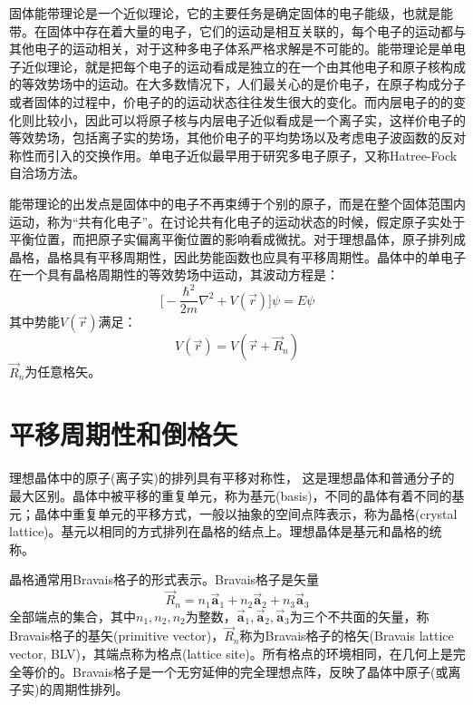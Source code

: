 固体能带理论是一个近似理论，它的主要任务是确定固体的电子能级，也就是能带。在固体中存在着大量的电子，它们的运动是相互关联的，每个电子的运动都与其他电子的运动相关，对于这种多电子体系严格求解是不可能的。能带理论是单电子近似理论，就是把每个电子的运动看成是独立的在一个由其他电子和原子核构成的等效势场中的运动。在大多数情况下，人们最关心的是价电子，在原子构成分子或者固体的过程中，价电子的的运动状态往往发生很大的变化。而内层电子的的变化则比较小，因此可以将原子核与内层电子近似看成是一个离子实，这样价电子的等效势场，包括离子实的势场，其他价电子的平均势场以及考虑电子波函数的反对称性而引入的交换作用。单电子近似最早用于研究多电子原子，又称Hatree-Fock自洽场方法。

能带理论的出发点是固体中的电子不再束缚于个别的原子，而是在整个固体范围内运动，称为“共有化电子”。在讨论共有化电子的运动状态的时候，假定原子实处于平衡位置，而把原子实偏离平衡位置的影响看成微扰。对于理想晶体，原子排列成晶格，晶格具有平移周期性，因此势能函数也应具有平移周期性。晶体中的单电子在一个具有晶格周期性的等效势场中运动，其波动方程是：
\begin{equation}\label{eq:solid-1}
  \biggl[-\dfrac{\hbar^2}{2m}\nabla^2+V(\vec r)\biggr]\psi=E\psi
\end{equation}
其中势能$V(\vec r)$满足：
\begin{equation}\label{eq:solid-2}
  V(\vec r)=V(\vec r+\vec R_n)
\end{equation}
$\vec R_n$为任意格矢。

\section{平移周期性和倒格矢}
理想晶体中的原子(离子实)的排列具有平移对称性，%
这是理想晶体和普通分子的最大区别。晶体中被平移的重复单元，称为基元(basis)，不同的晶体有着不同的基元；晶体中重复单元的平移方式，一般以抽象的空间点阵表示，称为晶格(crystal lattice)。基元以相同的方式排列在晶格的结点上。理想晶体是基元和晶格的统称。


晶格通常用Bravais格子的形式表示。Bravais格子是矢量
\begin{equation}
  \vec R_n=n_1\vec{\mathbf a}_1+n_2\vec{\mathbf a}_2+n_3\vec{\mathbf a}_3
  \label{eq:def-Bravais}
\end{equation}
全部端点的集合，其中$n_1,n_2,n_2$为整数，$\vec{\mathbf a}_1,\vec{\mathbf a}_2,\vec{\mathbf a}_3$为三个不共面的矢量，称Bravais格子的基矢(primitive vector)，$\vec R_n$称为Bravais格子的格矢(Bravais lattice vector, BLV)，其端点称为格点(lattice site)。所有格点的环境相同，在几何上是完全等价的。Bravais格子是一个无穷延伸的完全理想点阵，反映了晶体中原子(或离子实)的周期性排列。%


